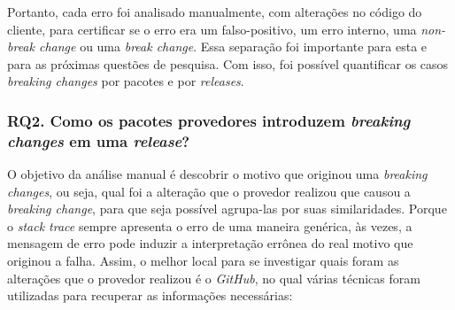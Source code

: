Portanto, cada erro foi analisado manualmente, com alterações no código do cliente, para certificar se o erro era um falso-positivo, um erro interno, uma \textit{non-break change} ou uma \textit{break change}. Essa separação foi importante para esta e para as próximas questões de pesquisa. Com isso, foi possível quantificar os casos \textit{breaking changes} por pacotes e por \textit{releases}.

\subsubsection{RQ2. Como os pacotes provedores introduzem \textit{breaking changes} em uma \textit{release}?}
\label{apr:rq2}
O objetivo da análise manual é descobrir o motivo que originou uma \textit{breaking changes}, ou seja, qual foi a alteração que o provedor realizou que causou a \textit{breaking change}, para que seja possível agrupa-las por suas similaridades. Porque o \textit{stack trace} sempre apresenta o erro de uma maneira genérica, às vezes, a mensagem de erro pode induzir a interpretação errônea do real motivo que originou a falha. Assim, o melhor local para se investigar quais foram as alterações que o provedor realizou é o \textit{GitHub}, no qual várias técnicas foram utilizadas para recuperar as informações necessárias:

